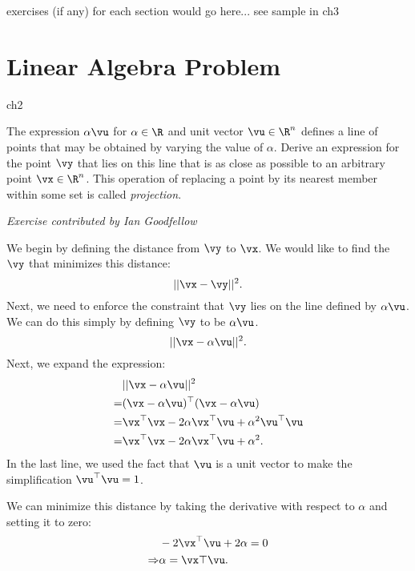 
exercises (if any) for each section would go here... see sample in ch3



\setcounter{section}{12}
\section{Linear Algebra Problem}

\begin{problems}{ch2}


	\begin{problem}
		The expression $\alpha \vu$ for $\alpha \in \R$ and
		unit vector $\vu \in \R^n$ defines a line of points that may be obtained by varying the
		value of $\alpha$.
		Derive an expression for the point $\vy$ that lies on this line that is
		as close as possible to an arbitrary point $\vx \in \R^n$.
		This operation of replacing a point by its nearest member within some set
		is called {\em projection}.
		
		{\em Exercise contributed by Ian Goodfellow}
		
		\begin{solution}
			We begin by defining the distance from $\vy$ to $\vx$.
			We would like to find the $\vy$ that minimizes this distance:
			\begin{equation}
			|| \vx - \vy||^2.
			\end{equation}
			Next, we need to enforce the constraint that $\vy$ lies on the line defined by $\alpha \vu$.
			We can do this simply by defining $\vy$ to be $\alpha \vu$.
			\begin{equation}
			|| \vx - \alpha \vu ||^2.
			\end{equation}
			Next, we expand the expression:
			\begin{align}
			& || \vx - \alpha \vu ||^2 \\
			=& ( \vx - \alpha \vu )^\top (\vx - \alpha \vu) \\
			=& \vx^\top \vx - 2 \alpha \vx^\top \vu + \alpha^2 \vu^\top \vu \\
			=& \vx^\top \vx - 2 \alpha \vx^\top \vu + \alpha^2.
			\end{align}
			In the last line,
			we used the fact that $\vu$ is a unit vector to make the simplification $\vu^\top \vu = 1$.
			
			We can minimize this distance by taking the derivative with respect to $\alpha$ and setting it to zero:
			\begin{align}
			& - 2  \vx^\top \vu + 2 \alpha = 0 \\
			\Rightarrow & \alpha = \vx\top \vu.
			\end{align}
			

\end{solution}
\end{problem}
\end{problems}
